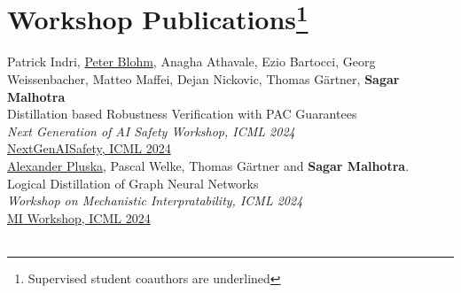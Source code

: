 \documentclass[10pt, a4paper]{article}
\newcommand{\years}[1]{\marginnote{\scriptsize #1}}
\begin{document}
\section*{Workshop Publications\footnote[1]{Supervised student coauthors are underlined}}
\noindent

\years{2024} Patrick Indri, \underline{Peter Blohm}, Anagha Athavale, Ezio Bartocci, Georg Weissenbacher, Matteo Maffei, Dejan Nickovic, Thomas Gärtner, \textbf{Sagar Malhotra}\\
Distillation based Robustness Verification with PAC Guarantees\\
\emph{Next Generation of AI Safety Workshop, ICML 2024}\\
\href{https://openreview.net/forum?id=vflefS3lmB}{NextGenAISafety, ICML 2024}\\

\years{2024}\underline{Alexander Pluska}, Pascal Welke, Thomas G{\"a}rtner and \textbf{Sagar Malhotra}.\\
Logical Distillation of Graph Neural Networks\\
\emph{Workshop on Mechanistic Interpratability, ICML 2024}\\
\href{https://openreview.net/forum?id=TfYnD2gYRO}{MI Workshop, ICML 2024}\\ \\
\end{document}
